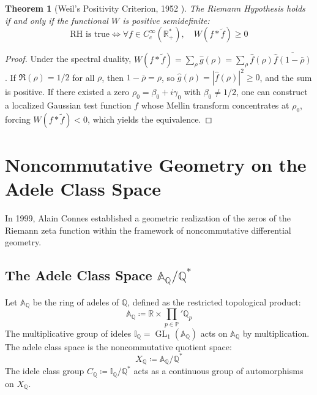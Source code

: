 \documentclass[11pt,a4paper]{article}
\newtheorem{theorem}{Theorem}[section]
\theoremstyle{definition}
\begin{document}
\begin{theorem}[Weil's Positivity Criterion, 1952 \cite{weil1952, weil1972}]\label{thm:weil_positivity_equiv}
The Riemann Hypothesis holds if and only if the functional $W$ is positive semidefinite:
\begin{equation}\label{eq:weil_equiv_statement}
\text{RH is true} \iff \forall f \in C_c^\infty(\mathbb{R}_+^*), \quad W(f \ast \tilde{f}) \ge 0
\end{equation}
\end{theorem}

\begin{proof}
Under the spectral duality, $W(f \ast \tilde{f}) = \sum_\rho \hat{g}(\rho) = \sum_\rho \hat{f}(\rho) \overline{\hat{f}(1 - \bar{\rho})}$. If $\Re(\rho) = 1/2$ for all $\rho$, then $1 - \bar{\rho} = \rho$, so $\hat{g}(\rho) = |\hat{f}(\rho)|^2 \ge 0$, and the sum is positive. If there existed a zero $\rho_0 = \beta_0 + i\gamma_0$ with $\beta_0 \ne 1/2$, one can construct a localized Gaussian test function $f$ whose Mellin transform concentrates at $\rho_0$, forcing $W(f \ast \tilde{f}) < 0$, which yields the equivalence.
\end{proof}

\newpage

\section{Noncommutative Geometry on the Adele Class Space}
In 1999, Alain Connes \cite{connes1999} established a geometric realization of the zeros of the Riemann zeta function within the framework of noncommutative differential geometry.

\subsection{The Adele Class Space \texorpdfstring{$\mathbb{A}_{\mathbb{Q}} / \mathbb{Q}^*$}{A(Q) / Q*}}
Let $\mathbb{A}_{\mathbb{Q}}$ be the ring of adeles of $\mathbb{Q}$, defined as the restricted topological product:
\begin{equation}
\mathbb{A}_{\mathbb{Q}} \coloneqq \mathbb{R} \times \prod_{p \in \mathbb{P}}' \mathbb{Q}_p
\end{equation}
The multiplicative group of ideles $\mathbb{I}_{\mathbb{Q}} = \operatorname{GL}_1(\mathbb{A}_{\mathbb{Q}})$ acts on $\mathbb{A}_{\mathbb{Q}}$ by multiplication.
The adele class space is the noncommutative quotient space:
\begin{equation}
X_{\mathbb{Q}} \coloneqq \mathbb{A}_{\mathbb{Q}} / \mathbb{Q}^*
\end{equation}
The idele class group $C_{\mathbb{Q}} \coloneqq \mathbb{I}_{\mathbb{Q}} / \mathbb{Q}^*$ acts as a continuous group of automorphisms on $X_{\mathbb{Q}}$.
\end{document}
